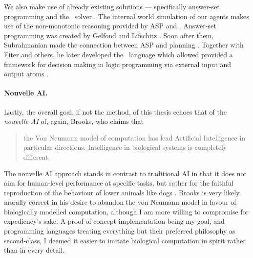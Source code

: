 We also make use of already existing solutions --- specifically answer-set programming and the \acthex\ solver \dlvhex. The internal world simulation of our agents makes use of the non-monotonic reasoning provided by ASP and \acthex.  Answer-set programming was created by Gelfond and Lifschitz \cite{asp1}. Soon after them, Subrahmanian made the connection between ASP and planning \cite{Subrahmanian95relatingstable}. Together with Eiter and others, he later developed the \acthex\ language which allowed provided a framework for decision making in logic programming via external input and output atoms \cite{heterogeneous1, heterogeneous2, heterogeneous3}.

\paragraph{Nouvelle AI.} Lastly, the overall goal, if not the method, of this thesis echoes that of the {\em nouvelle AI} of, again, Brooks, who claims that
\begin{quotation}
	the Von Neumann model of computation has lead Artificial Intelligence in particular directions. Intelligence in biological systems is completely different. \cite{Brooks91intelligencewithout}
\end{quotation}
The nouvelle AI approach stands in contrast to traditional AI in that it does not aim for human-level performance at specific tasks, but rather for the faithful reproduction of the behaviour of lower animals like dogs \cite{nouvelleAI}. Brooks is very likely morally correct in his desire to abandon the von Neumann model in favour of biologically modelled computation, although I am more willing to compromise for expediency's sake. A proof-of-concept implementation being my goal, and programming languages treating everything but their preferred philosophy as second-class, I deemed it easier to imitate biological computation in spirit rather than in every detail.